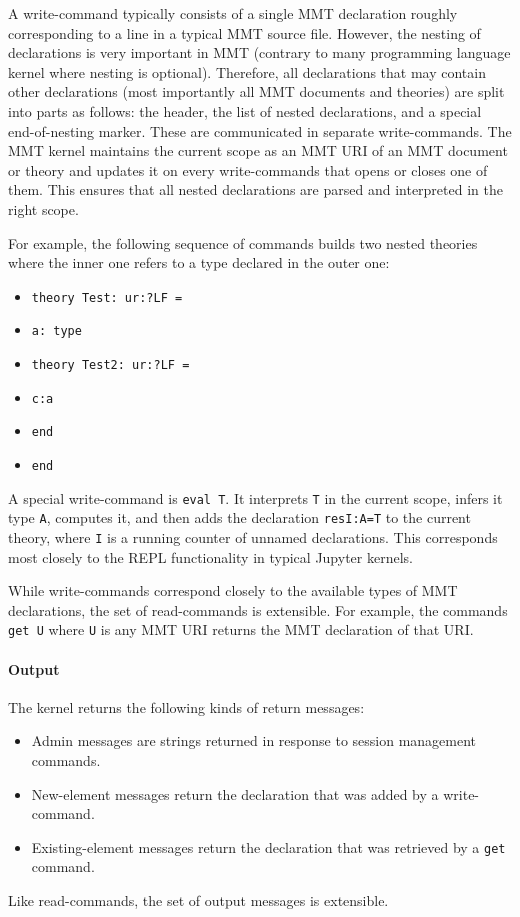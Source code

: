 A write-command typically consists of a single MMT declaration roughly corresponding to a line in a typical MMT source file.
However, the nesting of declarations is very important in MMT (contrary to many programming language kernel where nesting is optional).
Therefore, all declarations that may contain other declarations (most importantly all MMT documents and theories) are split into parts as follows: the header, the list of nested declarations, and a special end-of-nesting marker. These are communicated in separate write-commands.
The MMT kernel maintains the current scope as an MMT URI of an MMT document or theory and updates it on every write-commands that opens or closes one of them.
This ensures that all nested declarations are parsed and interpreted in the right scope.

For example, the following sequence of commands builds two nested theories where the inner one refers to a type declared in the outer one:
\begin{itemize}
\item \texttt{theory Test: ur:?LF =}
\item \texttt{a: type}
\item \texttt{theory Test2: ur:?LF =}
\item \texttt{c:a}
\item \texttt{end}
\item \texttt{end}
\end{itemize}

A special write-command is \texttt{eval T}.
It interprets \texttt{T} in the current scope, infers it type \texttt{A}, computes it, and then adds the declaration \texttt{resI:A=T} to the current theory, where \texttt{I} is a running counter of unnamed declarations.
This corresponds most closely to the REPL functionality in typical Jupyter kernels.

While write-commands correspond closely to the available types of MMT declarations, the set of read-commands is extensible.
For example, the commands \texttt{get U} where \texttt{U} is any MMT URI returns the MMT declaration of that URI.

\paragraph{Output}
The kernel returns the following kinds of return messages:
\begin{itemize}
\item Admin messages are strings returned in response to session management commands.
\item New-element messages return the declaration that was added by a write-command.
\item Existing-element messages return the declaration that was retrieved by a \texttt{get} command.
\end{itemize}
Like read-commands, the set of output messages is extensible.

